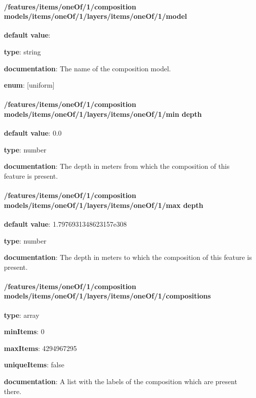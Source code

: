 \paragraph{/features/items/oneOf/1/composition models/items/oneOf/1/layers/items/oneOf/1/model} \begin{itemized}
\item {\bf default value}: 
\item {\bf type}: string
\item {\bf documentation}: The name of the composition model.
\item {\bf enum}: [uniform]\end{itemized}\paragraph{/features/items/oneOf/1/composition models/items/oneOf/1/layers/items/oneOf/1/min depth} \begin{itemized}
\item {\bf default value}: 0.0
\item {\bf type}: number
\item {\bf documentation}: The depth in meters from which the composition of this feature is present.
\end{itemized}\paragraph{/features/items/oneOf/1/composition models/items/oneOf/1/layers/items/oneOf/1/max depth} \begin{itemized}
\item {\bf default value}: 1.7976931348623157e308
\item {\bf type}: number
\item {\bf documentation}: The depth in meters to which the composition of this feature is present.
\end{itemized}\paragraph{/features/items/oneOf/1/composition models/items/oneOf/1/layers/items/oneOf/1/compositions} \begin{itemized}
\item {\bf type}: array
\item {\bf minItems}: 0
\item {\bf maxItems}: 4294967295
\item {\bf uniqueItems}: false
\item {\bf documentation}: A list with the labels of the composition which are present there.

\end{itemized}
